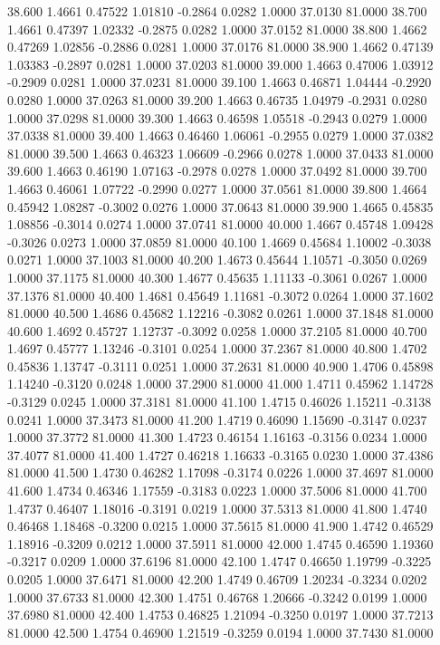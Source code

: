   38.600   1.4661   0.47522   1.01810  -0.2864   0.0282   1.0000  37.0130  81.0000
  38.700   1.4661   0.47397   1.02332  -0.2875   0.0282   1.0000  37.0152  81.0000
  38.800   1.4662   0.47269   1.02856  -0.2886   0.0281   1.0000  37.0176  81.0000
  38.900   1.4662   0.47139   1.03383  -0.2897   0.0281   1.0000  37.0203  81.0000
  39.000   1.4663   0.47006   1.03912  -0.2909   0.0281   1.0000  37.0231  81.0000
  39.100   1.4663   0.46871   1.04444  -0.2920   0.0280   1.0000  37.0263  81.0000
  39.200   1.4663   0.46735   1.04979  -0.2931   0.0280   1.0000  37.0298  81.0000
  39.300   1.4663   0.46598   1.05518  -0.2943   0.0279   1.0000  37.0338  81.0000
  39.400   1.4663   0.46460   1.06061  -0.2955   0.0279   1.0000  37.0382  81.0000
  39.500   1.4663   0.46323   1.06609  -0.2966   0.0278   1.0000  37.0433  81.0000
  39.600   1.4663   0.46190   1.07163  -0.2978   0.0278   1.0000  37.0492  81.0000
  39.700   1.4663   0.46061   1.07722  -0.2990   0.0277   1.0000  37.0561  81.0000
  39.800   1.4664   0.45942   1.08287  -0.3002   0.0276   1.0000  37.0643  81.0000
  39.900   1.4665   0.45835   1.08856  -0.3014   0.0274   1.0000  37.0741  81.0000
  40.000   1.4667   0.45748   1.09428  -0.3026   0.0273   1.0000  37.0859  81.0000
  40.100   1.4669   0.45684   1.10002  -0.3038   0.0271   1.0000  37.1003  81.0000
  40.200   1.4673   0.45644   1.10571  -0.3050   0.0269   1.0000  37.1175  81.0000
  40.300   1.4677   0.45635   1.11133  -0.3061   0.0267   1.0000  37.1376  81.0000
  40.400   1.4681   0.45649   1.11681  -0.3072   0.0264   1.0000  37.1602  81.0000
  40.500   1.4686   0.45682   1.12216  -0.3082   0.0261   1.0000  37.1848  81.0000
  40.600   1.4692   0.45727   1.12737  -0.3092   0.0258   1.0000  37.2105  81.0000
  40.700   1.4697   0.45777   1.13246  -0.3101   0.0254   1.0000  37.2367  81.0000
  40.800   1.4702   0.45836   1.13747  -0.3111   0.0251   1.0000  37.2631  81.0000
  40.900   1.4706   0.45898   1.14240  -0.3120   0.0248   1.0000  37.2900  81.0000
  41.000   1.4711   0.45962   1.14728  -0.3129   0.0245   1.0000  37.3181  81.0000
  41.100   1.4715   0.46026   1.15211  -0.3138   0.0241   1.0000  37.3473  81.0000
  41.200   1.4719   0.46090   1.15690  -0.3147   0.0237   1.0000  37.3772  81.0000
  41.300   1.4723   0.46154   1.16163  -0.3156   0.0234   1.0000  37.4077  81.0000
  41.400   1.4727   0.46218   1.16633  -0.3165   0.0230   1.0000  37.4386  81.0000
  41.500   1.4730   0.46282   1.17098  -0.3174   0.0226   1.0000  37.4697  81.0000
  41.600   1.4734   0.46346   1.17559  -0.3183   0.0223   1.0000  37.5006  81.0000
  41.700   1.4737   0.46407   1.18016  -0.3191   0.0219   1.0000  37.5313  81.0000
  41.800   1.4740   0.46468   1.18468  -0.3200   0.0215   1.0000  37.5615  81.0000
  41.900   1.4742   0.46529   1.18916  -0.3209   0.0212   1.0000  37.5911  81.0000
  42.000   1.4745   0.46590   1.19360  -0.3217   0.0209   1.0000  37.6196  81.0000
  42.100   1.4747   0.46650   1.19799  -0.3225   0.0205   1.0000  37.6471  81.0000
  42.200   1.4749   0.46709   1.20234  -0.3234   0.0202   1.0000  37.6733  81.0000
  42.300   1.4751   0.46768   1.20666  -0.3242   0.0199   1.0000  37.6980  81.0000
  42.400   1.4753   0.46825   1.21094  -0.3250   0.0197   1.0000  37.7213  81.0000
  42.500   1.4754   0.46900   1.21519  -0.3259   0.0194   1.0000  37.7430  81.0000
